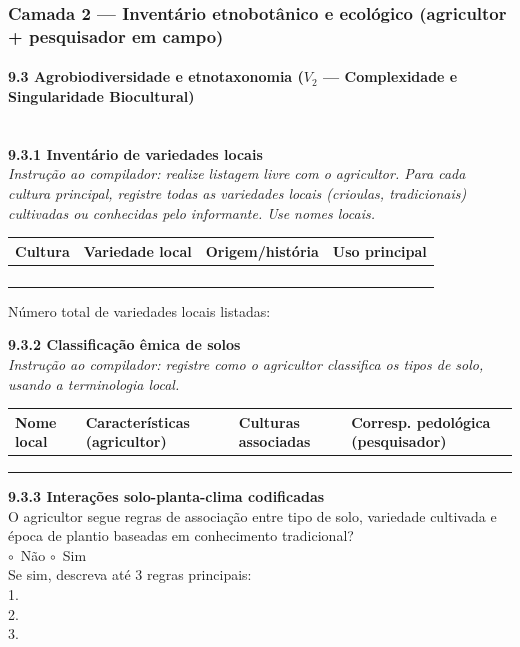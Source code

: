 \subsubsection{Camada 2 --- Inventário etnobotânico e ecológico (agricultor + pesquisador em campo)}

\paragraph{9.3 Agrobiodiversidade e etnotaxonomia ($V_2$ --- Complexidade e Singularidade Biocultural)}~\\[4pt]

\textbf{9.3.1 Inventário de variedades locais}\\[2pt]
\emph{Instrução ao compilador: realize listagem livre com o agricultor. Para cada cultura principal, registre todas as variedades locais (crioulas, tradicionais) cultivadas ou conhecidas pelo informante. Use nomes locais.}

{
\begin{longtable}[]{@{}p{3cm}p{3.5cm}p{3.5cm}p{2.5cm}@{}}
\toprule\noalign{}
Cultura & Variedade local & Origem/história & Uso principal \\
\midrule\noalign{}
\endhead
\bottomrule\noalign{}
\endlastfoot
 &  &  &  \\
 &  &  &  \\
 &  &  &  \\
 &  &  &  \\
\end{longtable}
}

Número total de variedades locais listadas: \dotfill

\medskip\noindent\textbf{9.3.2 Classificação êmica de solos}\\[2pt]
\emph{Instrução ao compilador: registre como o agricultor classifica os tipos de solo, usando a terminologia local.}

{
\begin{longtable}[]{@{}p{2.5cm}p{3cm}p{3cm}p{3.5cm}@{}}
\toprule\noalign{}
Nome local & Características (agricultor) & Culturas associadas & Corresp. pedológica (pesquisador) \\
\midrule\noalign{}
\endhead
\bottomrule\noalign{}
\endlastfoot
 &  &  &  \\
 &  &  &  \\
 &  &  &  \\
\end{longtable}
}

\medskip\noindent\textbf{9.3.3 Interações solo-planta-clima codificadas}\\[2pt]
O agricultor segue regras de associação entre tipo de solo, variedade cultivada e época de plantio baseadas em conhecimento tradicional?\\
$\circ$~Não \quad $\circ$~Sim\\[2pt]
Se sim, descreva até 3 regras principais:\\
1. \dotfill\\
2. \dotfill\\
3. \dotfill


